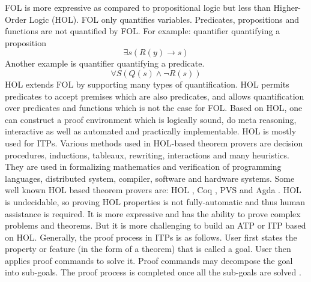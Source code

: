 FOL is more expressive as compared to propositional logic but less than Higher-Order Logic (HOL). FOL only quantifies variables. Predicates, 
propositions and functions are not quantified by FOL. For example:
quantifier quantifying a proposition
\begin{equation}\label{example}
    \exists s(R(y)\longrightarrow s)
\end{equation}
Another example is quantifier quantifying a predicate.
\begin{equation}\label{predicate}
    \forall S(Q(s)\wedge \neg R(s))
\end{equation}
HOL extends FOL by supporting many types of quantification. HOL permits predicates to 
accept premises which are also predicates, and allows quantification over predicates and functions which is not the case for FOL. Based on HOL,
one can construct a proof environment which is logically sound, do meta reasoning, interactive as well as automated and practically implementable. 
HOL is mostly used for ITPs. Various methods used in HOL-based theorem provers are decision
procedures, inductions, tableaux, rewriting, interactions and many heuristics. They are used in formalizing mathematics 
and verification of  programming languages, distributed system, compiler, software and hardware systems. 
Some well known HOL based theorem provers are: HOL , Coq , PVS  and Agda . 
HOL is undecidable, so proving HOL properties is not fully-automatic and thus human assistance is required. It is more expressive and has the ability to prove 
complex problems and theorems. But it is more challenging to build an ATP  or ITP based on HOL. Generally, the proof process in ITPs is as follows. 
User first states the property or feature (in the form of a theorem) that is called a goal. User then applies proof
commands to solve it. Proof commands may decompose the goal into sub-goals. The proof process is completed once all the sub-goals are 
solved .

